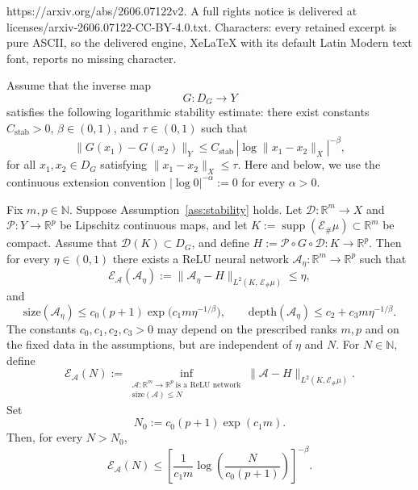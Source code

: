 \documentclass[10pt,a4paper]{amsart}
\newcommand{\supp}{\operatorname{supp}}
\begin{document}
https://arxiv.org/abs/2606.07122v2. A full rights notice is delivered at licenses/arxiv-2606.07122-CC-BY-4.0.txt. Characters: every retained excerpt is pure ASCII, so the delivered engine, XeLaTeX with its default Latin Modern text font, reports no missing character.
	\begin{assumption}\label{ass:stability}
		Assume that the inverse map
		\[
		G:D_G\to Y
		\]
		satisfies the following logarithmic stability estimate: there exist constants
		$C_{\mathrm{stab}}>0$, $\beta\in(0,1)$, and $\tau\in(0,1)$ such that
		\[
		\|G(x_1)-G(x_2)\|_Y
		\le
		C_{\mathrm{stab}}\,|\log \|x_1-x_2\|_X|^{-\beta},
		\]
		for all $x_1,x_2\in D_G$ satisfying $\|x_1-x_2\|_X\le \tau$. Here and below, we use the continuous extension convention $|\log 0|^{-\alpha}:=0$ for every $\alpha>0$.
	\end{assumption}

	\begin{theorem}\label{thm:abstract-approximation}
		Fix $m,p\in\mathbb N$. Suppose Assumption~\ref{ass:stability} holds. Let $\mathcal D:\mathbb R^m\to X$ and $\mathcal P:Y\to\mathbb R^p$ be Lipschitz continuous maps, and let $K:=\supp(\mathcal E_\#\mu)\subset \mathbb R^m$ be compact. Assume that $\mathcal D(K)\subset D_G$, and define $H:=\mathcal P\circ G\circ\mathcal D:K\to \mathbb R^p$.
		Then for every $\eta\in(0,1)$ there exists a ReLU neural network $\mathcal A_\eta:\mathbb R^m\to \mathbb R^p$
		such that
		\begin{equation*}
			\mathscr{E}_{\mathcal{A}}(\mathcal A_\eta)
			:=\|\mathcal A_\eta - H\|_{L^{2}(K,\,\mathcal{E}_{\#}\mu)}
			\le\eta,
		\end{equation*}
		and
		\begin{equation*}
			\mathrm{size}(\mathcal A_\eta)
			\le c_0(p+1)\exp \bigl(c_1m\eta^{-1/\beta}\bigr),
			\qquad
			\mathrm{depth}(\mathcal A_\eta)
			\le c_2+c_3m\eta^{-1/\beta}.
		\end{equation*}
		The constants $c_0,c_1,c_2,c_3>0$ may depend on the prescribed ranks $m,p$ and on the fixed data in the assumptions, but are independent of $\eta$ and $N$.
		For $N\in\mathbb N$, define
		\begin{equation*}
			\mathscr E_{\mathcal A}(N)
			:=
			\inf_{\substack{\mathcal A:\mathbb R^m\to\mathbb R^p\ \text{is a ReLU network}\\
			\mathrm{size}(\mathcal A)\le N}}
			\|\mathcal A-H\|_{L^2(K,\mathcal E_\#\mu)}.
		\end{equation*}
		Set
		\begin{equation*}
			N_0:=c_0(p+1)\exp(c_1m).
		\end{equation*}
		Then, for every $N> N_0$,
		\begin{equation*}
			\mathscr E_{\mathcal A}(N)
			\le
			\left[
			\frac{1}{c_1m}
			\log\!\left(\frac{N}{c_0(p+1)}\right)
			\right]^{-\beta}.
		\end{equation*}
	\end{theorem}
\end{document}
